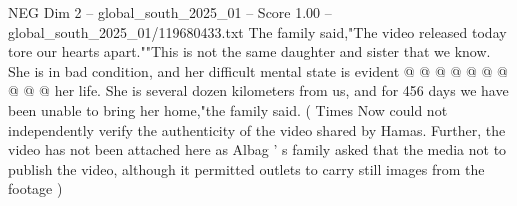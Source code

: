 \begin{textsample}{NEG Dim 2 – global\_south\_2025\_01 – Score 1.00 – global\_south\_2025\_01/119680433.txt}
The family said,"The video released today tore our hearts apart.""This is not the same daughter and sister that we know.
She is in bad condition, and her difficult mental state is evident @ @ @ @ @ @ @ @ @ @ her life.
She is several dozen kilometers from us, and for 456 days we have been unable to bring her home,"the family said. ( Times Now could not independently verify the authenticity of the video shared by Hamas.
Further, the video has not been attached here as Albag ' s family asked that the media not to publish the video, although it permitted outlets to carry still images from the footage )

\end{textsample}

